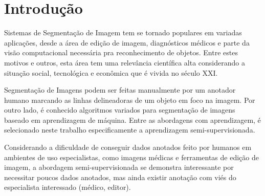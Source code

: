 \chapter{Introdução}\label{cap:introducao}

Sistemas de Segmentação de Imagem tem se tornado populares em variadas
aplicações, desde a área de edição de imagem, diagnósticos médicos e
parte da visão computacional necessária pra reconhecimento de
objetos. Entre estes motivos e outros, esta área tem uma relevância
científica alta considerando a situação social, tecnológica e
econômica que é vivida no século XXI.\@

\begin{figure}[h!]
        \captionsetup{width=16cm}
		\centering
\end{figure}


Segmentação de Imagens podem ser feitas manualmente por um anotador
humano marcando as linhas delineadoras de um objeto em foco na
imagem. Por outro lado, é conhecido algoritmos variados para
segmentação de imagens baseado em aprendizagem de máquina. Entre as
abordagens com aprendizagem, é selecionado neste trabalho
especificamente a aprendizagem semi-supervisionada.


Considerando a dificuldade de conseguir dados anotados feito por
humanos em ambientes de uso especialistas, como imagens médicas e
ferramentas de edição de imagem, a abordagem semi-supervisionada se
demonstra interessante por necessitar poucos dados anotados, mas ainda
existir anotação com viés do especialista interessado (médico,
editor).

